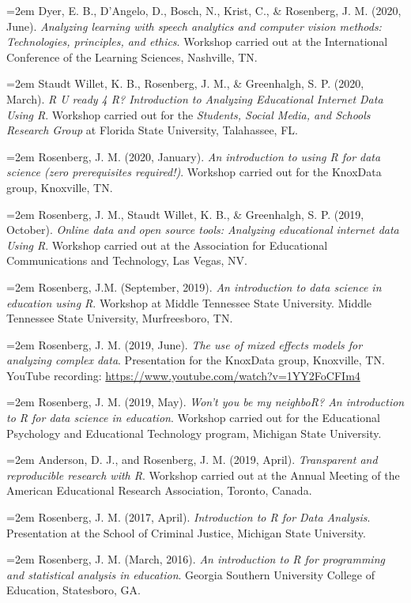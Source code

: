 \documentclass[
  14,
]{article}
\begin{document}
\hangindent=2em Dyer, E. B., D'Angelo, D., Bosch, N., Krist, C., \&
Rosenberg, J. M. (2020, June). \emph{Analyzing learning with speech
analytics and computer vision methods: Technologies, principles, and
ethics}. Workshop carried out at the International Conference of the
Learning Sciences, Nashville, TN.

\hangindent=2em Staudt Willet, K. B., Rosenberg, J. M., \& Greenhalgh,
S. P. (2020, March). \emph{R U ready 4 R? Introduction to Analyzing
Educational Internet Data Using R}. Workshop carried out for the
\emph{Students, Social Media, and Schools Research Group} at Florida
State University, Talahassee, FL.

\hangindent=2em Rosenberg, J. M. (2020, January). \emph{An introduction
to using R for data science (zero prerequisites required!)}. Workshop
carried out for the KnoxData group, Knoxville, TN.

\hangindent=2em Rosenberg, J. M., Staudt Willet, K. B., \& Greenhalgh,
S. P. (2019, October). \emph{Online data and open source tools:
Analyzing educational internet data Using R}. Workshop carried out at
the Association for Educational Communications and Technology, Las
Vegas, NV.

\hangindent=2em Rosenberg, J.M. (September, 2019). \emph{An introduction
to data science in education using R}. Workshop at Middle Tennessee
State University. Middle Tennessee State University, Murfreesboro, TN.

\hangindent=2em Rosenberg, J. M. (2019, June). \emph{The use of mixed
effects models for analyzing complex data}. Presentation for the
KnoxData group, Knoxville, TN. YouTube recording:
\url{https://www.youtube.com/watch?v=1YY2FoCFIm4}

\hangindent=2em Rosenberg, J. M. (2019, May). \emph{Won't you be my
neighboR? An introduction to R for data science in education}. Workshop
carried out for the Educational Psychology and Educational Technology
program, Michigan State University.

\hangindent=2em Anderson, D. J., and Rosenberg, J. M. (2019, April).
\emph{Transparent and reproducible research with R}. Workshop carried
out at the Annual Meeting of the American Educational Research
Association, Toronto, Canada.

\hangindent=2em Rosenberg, J. M. (2017, April). \emph{Introduction to R
for Data Analysis}. Presentation at the School of Criminal Justice,
Michigan State University.

\hangindent=2em Rosenberg, J. M. (March, 2016). \emph{An introduction to
R for programming and statistical analysis in education}. Georgia
Southern University College of Education, Statesboro, GA.
\end{document}
